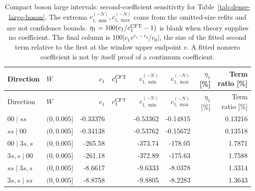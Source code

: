 \begingroup\setlength{\tabcolsep}{3pt}
\begin{longtable}{llrrrrrr}
\caption{Compact boson large intervals: second-coefficient sensitivity for Table~\ref{tab:dense-large-boson}. The extrema $c_{1,\min}^{(-N)},c_{1,\max}^{(-N)}$ come from the omitted-size refits and are not confidence bounds. $\eta_1=100(c_1/c_1^{\rm CFT}-1)$ is blank when theory supplies no coefficient. The final column is $100|c_1v^{r_1-r_0}/c_0|$, the size of the fitted second term relative to the first at the window upper endpoint $v$. A fitted nonzero coefficient is not by itself proof of a continuum coefficient.}
\label{tab:dense-large-boson-second}\\\toprule
Direction & $W$ & $c_1$ & $c_1^{\rm CFT}$ & $c_{1,\min}^{(-N)}$ & $c_{1,\max}^{(-N)}$ & $\eta_1$ [\%] & Term ratio [\%]\\\midrule
\endfirsthead
\toprule
Direction & $W$ & $c_1$ & $c_1^{\rm CFT}$ & $c_{1,\min}^{(-N)}$ & $c_{1,\max}^{(-N)}$ & $\eta_1$ [\%] & Term ratio [\%]\\\midrule
\endhead
\bottomrule\endfoot
$00\mid ss$ & $(0,0.005]$ & -0.33376 &  & -0.53362 & -0.14815 &  & 0.13216\\
$ss\mid 00$ & $(0,0.005]$ & -0.34138 &  & -0.53762 & -0.15672 &  & 0.13518\\
$00\mid 3s,s$ & $(0,0.005]$ & -265.58 &  & -373.74 & -178.05 &  & 1.7871\\
$3s,s\mid 00$ & $(0,0.005]$ & -261.18 &  & -372.89 & -175.63 &  & 1.7588\\
$ss\mid 3s,s$ & $(0,0.005]$ & -8.6617 &  & -9.6333 & -8.0378 &  & 1.3314\\
$3s,s\mid ss$ & $(0,0.005]$ & -8.8758 &  & -9.8805 & -8.2283 &  & 1.3643\\
\end{longtable}
\endgroup

